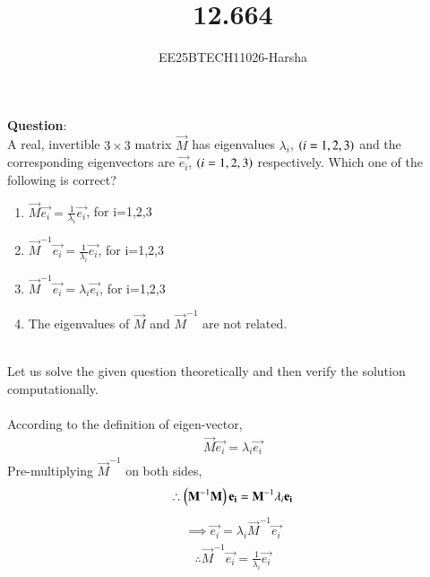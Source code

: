 \documentclass[journal]{IEEEtran}
\begin{document}

\vspace{3cm}

\title{12.664}
\author{EE25BTECH11026-Harsha}
 \maketitle
{\let\newpage\relax\maketitle}

\renewcommand{\thefigure}{\theenumi}
\renewcommand{\thetable}{\theenumi}
\setlength{\intextsep}{10pt} %


\renewcommand{\thetable}{\theenumi}

\textbf{Question}:\\
A real, invertible $3 \times 3$ matrix $\vec{M}$ has eigenvalues $\lambda_i$, $\left(i=1,2,3\right)$ and the corresponding eigenvectors are $\vec{e_i}$, $\left(i=1,2,3\right)$ respectively. Which one of the following is correct?
\begin{enumerate}
    \item $\vec{M}\vec{e_i}=\frac{1}{\lambda_i}\vec{e_i}$, for i=1,2,3
    \item $\vec{M}^{-1}\vec{e_i}=\frac{1}{\lambda_i}\vec{e_i}$, for i=1,2,3
    \item $\vec{M}^{-1}\vec{e_i}=\lambda_i\vec{e_i}$, for i=1,2,3
    \item The eigenvalues of $\vec{M}$ and $\vec{M}^{-1}$ are not related.
\end{enumerate}
\solution \\
Let us solve the given question theoretically and then verify the solution computationally.\\
\\
According to the definition of eigen-vector,
\begin{align}
    \vec{M}\vec{e_i}=\lambda_i\vec{e_i}
\end{align}
Pre-multiplying $\vec{M}^{-1}$ on both sides,
\begin{align}
    \therefore \left(\mathbf{M}^{-1}\mathbf{M}\right)\mathbf{e_i}=\mathbf{M}^{-1}\lambda_i\mathbf{e_i}
\end{align}
\begin{align}
    \implies \vec{e_i}=\lambda_i\vec{M}^{-1}\vec{e_i}
\end{align}
\begin{align}
    \therefore \vec{M}^{-1}\vec{e_i}=\frac{1}{\lambda_i}\vec{e_i}
\end{align}
\end{document}
